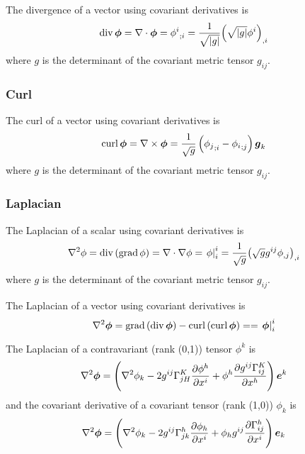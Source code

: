 The divergence of a vector using covariant derivatives is
\begin{equation}
  \divop \vectr{\phi} = \divergence{}{\vectr{\phi}}=\covarderiv{\phi^{i}}{i}=\frac{1}{\sqrt{\abs{g}}}\partialderiv{\pbrac{\sqrt{\abs{g}}\phi^{i}}}{i}
\end{equation}
where $g$ is the determinant of the covariant metric tensor $g_{ij}$.

\subsubsection{Curl}

The curl of a vector using covariant derivatives is
\begin{equation}
  \curlop \vectr{\phi} = \curl{}{\vectr{\phi}}=\frac{1}{\sqrt{g}}\pbrac{\covarderiv{\phi_{j}}{i}-\covarderiv{\phi_{i}}{j}}\vectr{g}_{k}
\end{equation}
where $g$ is the determinant of the covariant metric tensor $g_{ij}$.

\subsubsection{Laplacian}

The Laplacian of a scalar using covariant derivatives is
\begin{equation}
  \laplacian{}{\phi}=\divop\pbrac{\gradop\phi}=\divergence{}{\gradient{}{\phi}}=\mixedderiv{\phi}{i}{i}=\frac{1}{\sqrt{g}}\partialderiv{\pbrac{\sqrt{g}g^{ij}\partialderiv{\phi}{j}}}{i}
\end{equation}
where $g$ is the determinant of the covariant metric tensor $g_{ij}$.

The Laplacian of a vector using covariant derivatives is
\begin{equation}
  \laplacian{}{\vectr{\phi}}=\gradop\pbrac{\divop\vectr{\phi}}-\curlop \pbrac{\curlop\vectr{\phi}}==\mixedderiv{\vectr{\phi}}{i}{i}
\end{equation}

The Laplacian of a contravariant (rank (0,1)) tensor $\phi^{k}$ is
\begin{equation}
  \laplacian{}{\vectr{\phi}}=\pbrac{\laplacian{}{\phi_{k}}-2g^{ij}\christoffel{K}{j}{H}\delby{\phi^{h}}{x^{i}}+\phi^{h}\delby{g^{ij}\christoffel{K}{i}{j}}{x^{h}}}\vectr{e}^{k}
\end{equation}
and the covariant derivative of a covariant tensor  (rank (1,0)) $\phi_{k}$ is
\begin{equation}
  \laplacian{}{\vectr{\phi}}=\pbrac{\laplacian{}{\phi_{k}}-2g^{ij}\christoffel{h}{j}{k}\delby{\phi_{h}}{x^{i}}+\phi_{h}g^{ij}\delby{\christoffel{h}{i}{j}}{x^{i}}}\vectr{e}_{k}
\end{equation}

